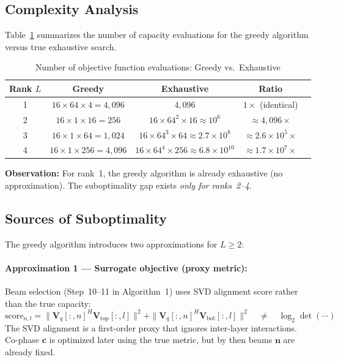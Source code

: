 \documentclass[12pt, a4paper]{article}
\newcommand{\bV}{\mathbf{V}}
\begin{document}
\subsection{Complexity Analysis}

Table~\ref{tab:complexity} summarizes the number of capacity evaluations
for the greedy algorithm versus true exhaustive search.

\begin{table}[H]
\centering
\caption{Number of objective function evaluations: Greedy vs.\ Exhaustive}
\label{tab:complexity}
\begin{tabular}{ccccc}
\toprule
Rank $L$ & Greedy & Exhaustive & Ratio \\
\midrule
1 & $16 \times 64 \times 4 = 4{,}096$   & $4{,}096$              & $1\times$ (identical) \\
2 & $16 \times 1 \times 16 = 256$        & $16 \times 64^2 \times 16 \approx 10^6$ & $\approx 4{,}096\times$ \\
3 & $16 \times 1 \times 64 = 1{,}024$   & $16 \times 64^3 \times 64 \approx 2.7\times10^8$ & $\approx 2.6\times10^5\times$ \\
4 & $16 \times 1 \times 256 = 4{,}096$  & $16 \times 64^4 \times 256 \approx 6.8\times10^{10}$ & $\approx 1.7\times10^7\times$ \\
\bottomrule
\end{tabular}
\end{table}

\textbf{Observation:} For rank~1, the greedy algorithm is already exhaustive
(no approximation). The suboptimality gap exists \emph{only for ranks~2--4}.

\subsection{Sources of Suboptimality}

The greedy algorithm introduces two approximations for $L \geq 2$:

\paragraph{Approximation 1 — Surrogate objective (proxy metric):}
Beam selection (Step~10--11 in Algorithm~1) uses SVD alignment score
rather than the true capacity:
\begin{equation}
    \mathrm{score}_{n,l} = \|\bV_{q}[:,n]^H \bV_\mathrm{top}[:,l]\|^2
                           + \|\bV_{q}[:,n]^H \bV_\mathrm{bot}[:,l]\|^2
    \quad \neq \quad
    \log_2\det(\cdots)
\end{equation}
The SVD alignment is a first-order proxy that ignores inter-layer interactions.
Co-phase $\mathbf{c}$ is optimized later using the true metric, but by then beams $\mathbf{n}$ are already fixed.
\end{document}
